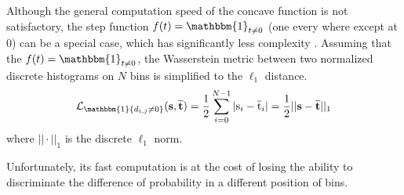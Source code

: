 Although the general computation speed of the concave function is not satisfactory, the step function $f(t)=\mathbbm{1}_{t\neq 0}$ (one every where except at 0) can be a special case, which has significantly less complexity \cite{villani2003topics}. Assuming that the $f(t)=\mathbbm{1}_{t\neq 0}$, the Wasserstein metric between two normalized discrete histograms on $N$ bins is simplified to the $\ell_1$ distance. \begin{equation}
\mathcal{L}_{\mathbbm{1}{d_{i,j}\neq 0}}{(\rm{{\textbf{s},\overline{\textbf{t}}}})}=\frac{1}{2}\sum_{i=0}^{N-1}{|{\rm{s}}_i-{\rm{\overline{t}}}_i|}=\frac{1}{2}||{\rm{\textbf{s}}}-{\rm{\overline{\textbf{t}}}}||_1
\end{equation}where $||\cdot||_1$ is the discrete $\ell_1$ norm.  

Unfortunately, its fast computation is at the cost of losing the ability to discriminate the difference of probability in a different position of bins.
